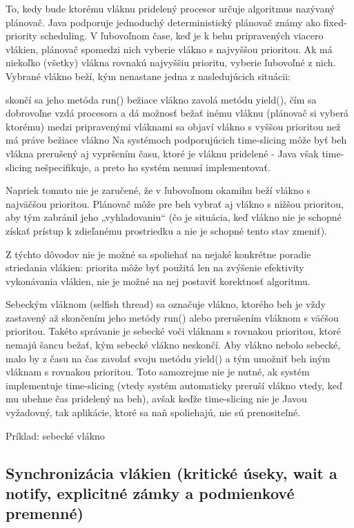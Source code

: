 To, kedy bude ktorému vláknu pridelený procesor určuje algoritmus nazývaný plánovač. Java podporuje jednoduchý deterministický plánovač známy ako fixed-priority scheduling. V ľubovoľnom čase, keď je k behu pripravených viacero vlákien, plánovač spomedzi nich vyberie vlákno s najvyššou prioritou. Ak má niekoľko (všetky) vlákna rovnakú najvyššiu prioritu, vyberie ľubovoľné z nich. Vybrané vlákno beží, kým nenastane jedna z nasledujúcich situácii:

skončí sa jeho metóda run()
bežiace vlákno zavolá metódu yield(), čím sa dobrovoľne vzdá procesora a dá možnosť bežať inému vláknu (plánovač si vyberá ktorému)
medzi pripravenými vláknami sa objaví vlákno s vyššou prioritou než má práve bežiace vlákno
Na systémoch podporujúcich time-slicing môže byť beh vlákna prerušený aj vypršením času, ktoré je vláknu pridelené - Java však time-slicing nešpecifikuje, a preto ho systém nemusí implementovať.

Napriek tomuto nie je zaručené, že v ľubovoľnom okamihu beží vlákno s najväčšou prioritou. Plánovač môže pre beh vybrať aj vlákno s nižšou prioritou, aby tým zabránil jeho „vyhladovaniu“ (čo je situácia, keď vlákno nie je schopné získať prístup k zdieľanému prostriedku a nie je schopné tento stav zmeniť).

Z týchto dôvodov nie je možné sa spoliehať na nejaké konkrétne poradie striedania vlákien: priorita môže byť použitá len na zvýšenie efektivity vykonávania vlákien, nie je možné na nej postaviť korektnosť algoritmu.

Sebeckým vláknom (selfish thread) sa označuje vlákno, ktorého beh je vždy zastavený až skončením jeho metódy run() alebo prerušením vláknom s väčšou prioritou. Takéto správanie je sebecké voči vláknam s rovnakou prioritou, ktoré nemajú šancu bežať, kým sebecké vlákno neskončí. Aby vlákno nebolo sebecké, malo by z času na čas zavolať svoju metódu yield() a tým umožniť beh iným vláknam s rovnakou prioritou. Toto samozrejme nie je nutné, ak systém implementuje time-slicing (vtedy systém automaticky preruší vlákno vtedy, keď mu ubehne čas pridelený na beh), avšak keďže time-slicing nie je Javou vyžadovný, tak aplikácie, ktoré sa naň spoliehajú, nie sú prenositeľné.

Príklad: sebecké vlákno


	\subsection{Synchronizácia vlákien (kritické úseky, wait a notify, explicitné zámky a podmienkové premenné)}

